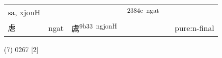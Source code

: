 \documentclass[14pt,a4paper]{scrartcl}
\begin{document}
\begin{longtable}[c]{@{}llllll@{}}
\begin{minipage}[t]{0.14\columnwidth}
sa, xjonH
\strut\end{minipage} &
\begin{minipage}[t]{0.14\columnwidth}\raggedright\strut
\strut\end{minipage} &
\begin{minipage}[t]{0.14\columnwidth}\raggedright\strut
\strut\end{minipage} &
\begin{minipage}[t]{0.14\columnwidth}\raggedright\strut
𣡌\textsuperscript{2384c~ngat}
\strut\end{minipage} &
\begin{minipage}[t]{0.14\columnwidth}\raggedright\strut
\strut\end{minipage}\tabularnewline
\begin{minipage}[t]{0.14\columnwidth}\raggedright\strut
䖈
\strut\end{minipage} &
\begin{minipage}[t]{0.14\columnwidth}\raggedright\strut
ngat
\strut\end{minipage} &
\begin{minipage}[t]{0.14\columnwidth}\raggedright\strut
鬳\textsuperscript{9b33~ngjonH}
\strut\end{minipage} &
\begin{minipage}[t]{0.14\columnwidth}\raggedright\strut
\strut\end{minipage} &
\begin{minipage}[t]{0.14\columnwidth}\raggedright\strut
\strut\end{minipage} &
\begin{minipage}[t]{0.14\columnwidth}\raggedright\strut
pure:n-final
\strut\end{minipage}\tabularnewline
\bottomrule
\end{longtable}

(7) 0267 {[}2{]}
\end{document}

